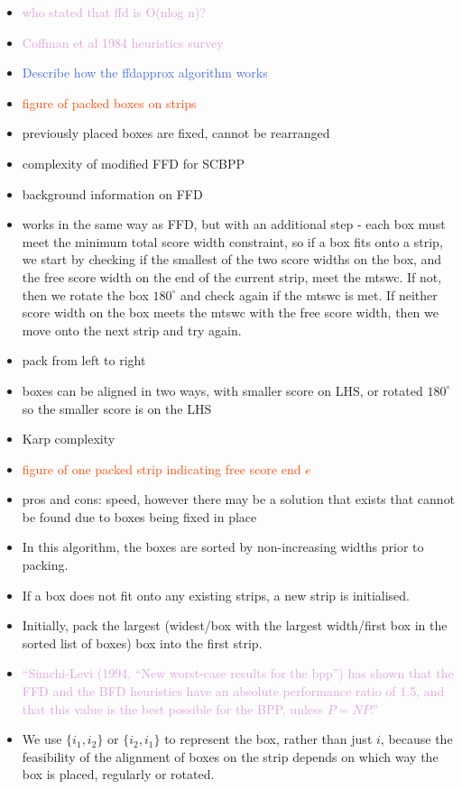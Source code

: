 \documentclass[oribibl]{llncs}
\begin{document}
\begin{itemize}
	\item \textcolor{Plum}{who stated that ffd is O(nlog n)?}
	\item \textcolor{Plum}{Coffman et al 1984 heuristics survey}
	\item \textcolor{RoyalBlue}{Describe how the ffdapprox algorithm works}
	\item \textcolor{OrangeRed}{figure of packed boxes on strips}
	\item previously placed boxes are fixed, cannot be rearranged
	\item complexity of modified FFD for SCBPP
	\item background information on FFD
	\item works in the same way as FFD, but with an additional step - each box must meet the minimum total score width constraint, so if a box fits onto a strip, we start by checking if the smallest of the two score widths on the box, and the free score width on the end of the current strip, meet the mtswc. If not, then we rotate the box $180^{\circ}$ and check again if the mtswc is met. If neither score width on the box meets the mtswc with the free score width, then we move onto the next strip and try again.
	\item pack from left to right
	\item boxes can be aligned in two ways, with smaller score on LHS, or rotated $180^{\circ}$ so the smaller score is on the LHS
	\item Karp complexity
	\item \textcolor{OrangeRed}{figure of one packed strip indicating free score end $e$}
	\item pros and cons: speed, however there may be a solution that exists that cannot be found due to boxes being fixed in place
	\item In this algorithm, the boxes are sorted by non-increasing widths prior to packing.
	\item If a box does not fit onto any existing strips, a new strip is initialised.
	\item Initially, pack the largest (widest/box with the largest width/first box in the sorted list of boxes) box into the first strip.
	\item \textcolor{Plum}{``Simchi-Levi (1994, ``New worst-case results for the bpp'') has shown that the FFD and the BFD heuristics have an absolute performance ratio of 1.5, and that this value is the best possible for the BPP, unless $P = NP$.''}
	\item We use $\{i_1, i_2\}$ or $\{i_2, i_1\}$ to represent the box, rather than just $i$, because the feasibility of the alignment of boxes on the strip depends on which way the box is placed, regularly or rotated.
\end{itemize}
\end{document}

